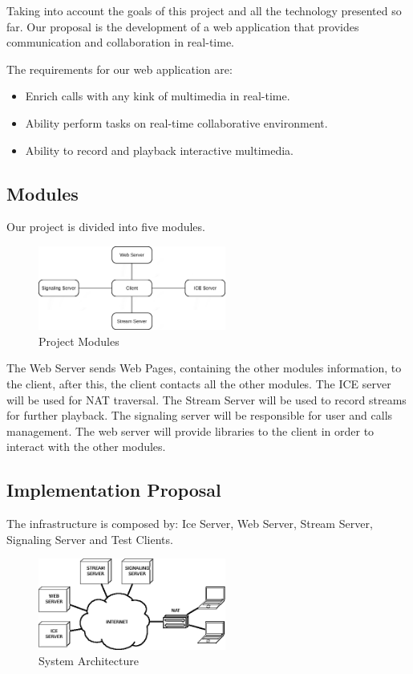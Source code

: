 Taking into account the goals of this project and all the technology presented so far. Our proposal is the development of a web application that provides communication and collaboration in real-time.

The requirements for our web application are:

\begin{itemize}
 \item Enrich calls with any kink of multimedia in real-time.
 \item Ability perform tasks on real-time collaborative environment.
 \item Ability to record and playback interactive multimedia.
\end{itemize}

\subsection{Modules}
	Our project is divided into five modules.

\begin{figure}[H]
	\centering
	\includegraphics[width=0.55\textwidth]{figures/archs.png}
	\caption{Project Modules}
\end{figure}

 The Web Server sends Web Pages, containing the other modules information, to the client, after this, the client contacts all the other modules. The ICE server will be used for \ac{NAT} traversal. The Stream Server will be used to record streams for further playback. The signaling server will be responsible for user and calls management. The web server will provide libraries to the client in order to interact with the other modules.  

\subsection{Implementation Proposal}
The infrastructure is composed by: Ice Server, Web Server, Stream Server, Signaling Server and Test Clients.

\begin{figure}[H]
	\centering
	\includegraphics[width=0.55\textwidth]{figures/arch.png}
	\caption{System Architecture}
\end{figure}

